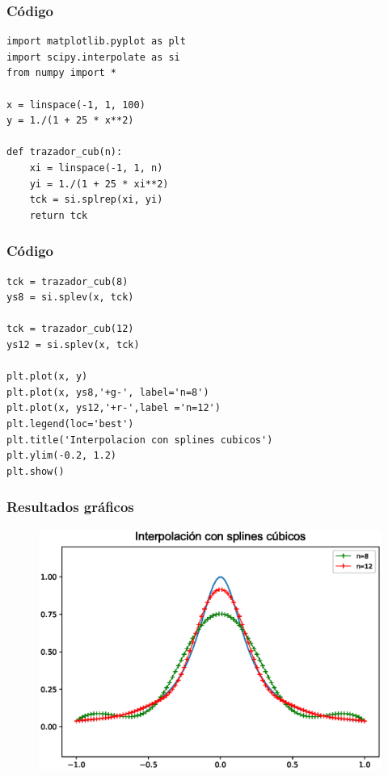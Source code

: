 \begin{frame}
\frametitle{Código}
\begin{lstlisting}[basicstyle=\ttfamily\normalsize, columns=fullflexible]
import matplotlib.pyplot as plt
import scipy.interpolate as si
from numpy import *

x = linspace(-1, 1, 100)
y = 1./(1 + 25 * x**2)

def trazador_cub(n):
    xi = linspace(-1, 1, n)
    yi = 1./(1 + 25 * xi**2)
    tck = si.splrep(xi, yi)
    return tck
\end{lstlisting}
\end{frame}
\begin{frame}
\frametitle{Código}
\begin{lstlisting}[basicstyle=\ttfamily\normalsize, columns=fullflexible]
tck = trazador_cub(8)
ys8 = si.splev(x, tck)

tck = trazador_cub(12)
ys12 = si.splev(x, tck)

plt.plot(x, y)
plt.plot(x, ys8,'+g-', label='n=8')
plt.plot(x, ys12,'+r-',label ='n=12')
plt.legend(loc='best')
plt.title('Interpolacion con splines cubicos')
plt.ylim(-0.2, 1.2)
plt.show()
\end{lstlisting}
\end{frame}
\begin{frame}
\frametitle{Resultados gráficos}
\begin{figure}
	\centering
	\includegraphics[scale=0.5]{Imagenes/Funcion_Runge_2017_03.eps} 
\end{figure}
\end{frame}

